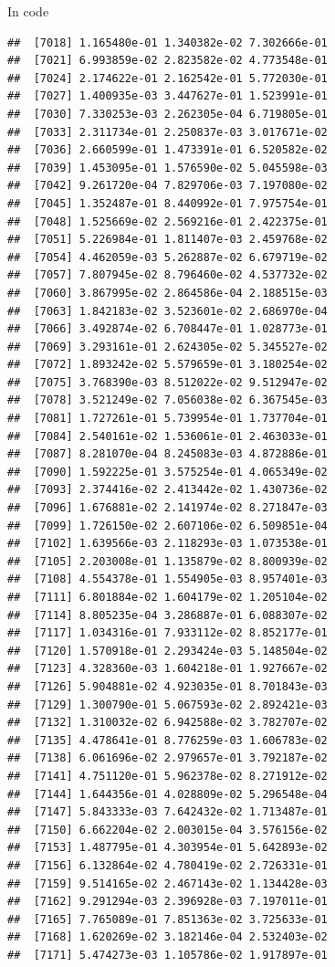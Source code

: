 \documentclass[ignorenonframetext,]{beamer}
\begin{document}
\begin{frame}[fragile]{In code}
\begin{verbatim}
##  [7018] 1.165480e-01 1.340382e-02 7.302666e-01
##  [7021] 6.993859e-02 2.823582e-02 4.773548e-01
##  [7024] 2.174622e-01 2.162542e-01 5.772030e-01
##  [7027] 1.400935e-03 3.447627e-01 1.523991e-01
##  [7030] 7.330253e-03 2.262305e-04 6.719805e-01
##  [7033] 2.311734e-01 2.250837e-03 3.017671e-02
##  [7036] 2.660599e-01 1.473391e-01 6.520582e-02
##  [7039] 1.453095e-01 1.576590e-02 5.045598e-03
##  [7042] 9.261720e-04 7.829706e-03 7.197080e-02
##  [7045] 1.352487e-01 8.440992e-01 7.975754e-01
##  [7048] 1.525669e-02 2.569216e-01 2.422375e-01
##  [7051] 5.226984e-01 1.811407e-03 2.459768e-02
##  [7054] 4.462059e-03 5.262887e-02 6.679719e-02
##  [7057] 7.807945e-02 8.796460e-02 4.537732e-02
##  [7060] 3.867995e-02 2.864586e-04 2.188515e-03
##  [7063] 1.842183e-02 3.523601e-02 2.686970e-04
##  [7066] 3.492874e-02 6.708447e-01 1.028773e-01
##  [7069] 3.293161e-01 2.624305e-02 5.345527e-02
##  [7072] 1.893242e-02 5.579659e-01 3.180254e-02
##  [7075] 3.768390e-03 8.512022e-02 9.512947e-02
##  [7078] 3.521249e-02 7.056038e-02 6.367545e-03
##  [7081] 1.727261e-01 5.739954e-01 1.737704e-01
##  [7084] 2.540161e-02 1.536061e-01 2.463033e-01
##  [7087] 8.281070e-04 8.245083e-03 4.872886e-01
##  [7090] 1.592225e-01 3.575254e-01 4.065349e-02
##  [7093] 2.374416e-02 2.413442e-02 1.430736e-02
##  [7096] 1.676881e-02 2.141974e-02 8.271847e-03
##  [7099] 1.726150e-02 2.607106e-02 6.509851e-04
##  [7102] 1.639566e-03 2.118293e-03 1.073538e-01
##  [7105] 2.203008e-01 1.135879e-02 8.800939e-02
##  [7108] 4.554378e-01 1.554905e-03 8.957401e-03
##  [7111] 6.801884e-02 1.604179e-02 1.205104e-02
##  [7114] 8.805235e-04 3.286887e-01 6.088307e-02
##  [7117] 1.034316e-01 7.933112e-02 8.852177e-01
##  [7120] 1.570918e-01 2.293424e-03 5.148504e-02
##  [7123] 4.328360e-03 1.604218e-01 1.927667e-02
##  [7126] 5.904881e-02 4.923035e-01 8.701843e-03
##  [7129] 1.300790e-01 5.067593e-02 2.892421e-03
##  [7132] 1.310032e-02 6.942588e-02 3.782707e-02
##  [7135] 4.478641e-01 8.776259e-03 1.606783e-02
##  [7138] 6.061696e-02 2.979657e-01 3.792187e-02
##  [7141] 4.751120e-01 5.962378e-02 8.271912e-02
##  [7144] 1.644356e-01 4.028809e-02 5.296548e-04
##  [7147] 5.843333e-03 7.642432e-02 1.713487e-01
##  [7150] 6.662204e-02 2.003015e-04 3.576156e-02
##  [7153] 1.487795e-01 4.303954e-01 5.642893e-02
##  [7156] 6.132864e-02 4.780419e-02 2.726331e-01
##  [7159] 9.514165e-02 2.467143e-02 1.134428e-03
##  [7162] 9.291294e-03 2.396928e-03 7.197011e-01
##  [7165] 7.765089e-01 7.851363e-02 3.725633e-01
##  [7168] 1.620269e-02 3.182146e-04 2.532403e-02
##  [7171] 5.474273e-03 1.105786e-02 1.917897e-01

\end{verbatim}
\end{frame}
\end{document}
